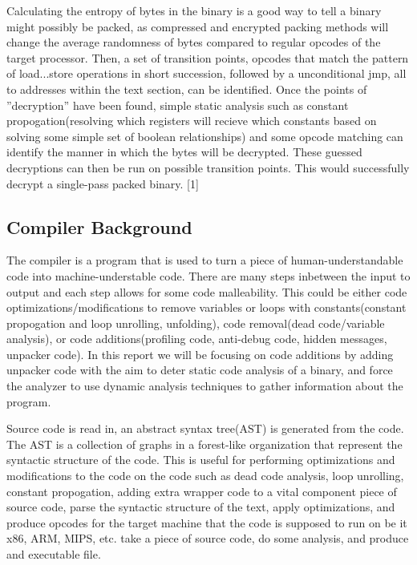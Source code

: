 \documentclass{article}
\begin{document}
\newline

Calculating the entropy of bytes in the binary is a good way to tell a binary might possibly be packed, as compressed and encrypted packing methods will change the average randomness of bytes compared to regular opcodes of the target processor. Then, a set of transition points, opcodes that match the pattern of load...store operations in short succession, followed by a unconditional jmp, all to addresses within the text section, can be identified. Once the points of ''decryption'' have been found, simple static analysis such as constant propogation(resolving which registers will recieve which constants based on solving some simple set of boolean relationships) and some opcode matching can identify the manner in which the bytes will be decrypted. These guessed decryptions can then be run on possible transition points. This would successfully decrypt a single-pass packed binary. [1]

\newline

\subsection{Compiler Background}
The compiler is a program that is used to turn a piece of human-understandable code into machine-understable code. There are many steps inbetween the input to output and each step allows for some code malleability. This could be either code optimizations/modifications to remove variables or loops with constants(constant propogation and loop unrolling, unfolding), code removal(dead code/variable analysis), or code additions(profiling code, anti-debug code, hidden messages,  unpacker code). In this report we will be focusing on code additions by adding unpacker code with the aim to deter static code analysis of a binary, and force the analyzer to use dynamic analysis techniques to gather information about the program. 

Source code is read in, an abstract syntax tree(AST) is generated from the code. The AST is a collection of graphs in a forest-like organization that represent the syntactic structure of the code. This is useful for performing optimizations and modifications to the code on the code such as dead code analysis, loop unrolling, constant propogation, adding extra wrapper code to a vital component piece of source code, parse the syntactic structure of the text, apply optimizations, and produce opcodes for the target machine that the code is supposed to run on be it x86, ARM, MIPS, etc. take a piece of source code, do some analysis, and produce and executable file. 
\end{document}
